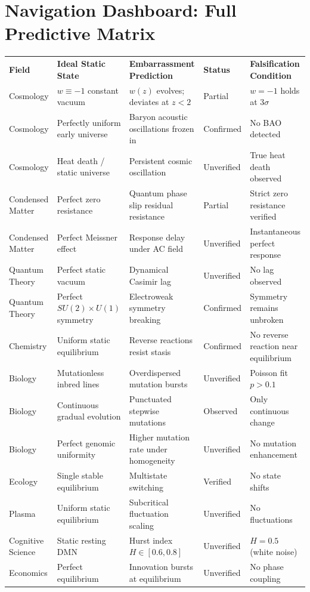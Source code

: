 \documentclass[10pt,a4paper]{article}
\begin{document}
\section*{Navigation Dashboard: Full Predictive Matrix}
\begin{tcolorbox}[title=EMBARRASSMENT PREDICTION DASHBOARD v1.0,colback=white,colframe=black!70,fonttitle=\bfseries\large]
\scriptsize
\renewcommand{\arraystretch}{1.8}
\begin{tabularx}{\textwidth}{LLLLL}
\textbf{Field} & \textbf{Ideal Static State} & \textbf{Embarrassment Prediction} & \textbf{Status} & \textbf{Falsification Condition} \\
Cosmology & $w\equiv-1$ constant vacuum & $w(z)$ evolves; deviates at $z<2$ & Partial & $w=-1$ holds at $3\sigma$ \\
Cosmology & Perfectly uniform early universe & Baryon acoustic oscillations frozen in & Confirmed & No BAO detected \\
Cosmology & Heat death / static universe & Persistent cosmic oscillation & Unverified & True heat death observed \\
Condensed Matter & Perfect zero resistance & Quantum phase slip residual resistance & Partial & Strict zero resistance verified \\
Condensed Matter & Perfect Meissner effect & Response delay under AC field & Unverified & Instantaneous perfect response \\
Quantum Theory & Perfect static vacuum & Dynamical Casimir lag & Unverified & No lag observed \\
Quantum Theory & Perfect $SU(2)\times U(1)$ symmetry & Electroweak symmetry breaking & Confirmed & Symmetry remains unbroken \\
Chemistry & Uniform static equilibrium & Reverse reactions resist stasis & Confirmed & No reverse reaction near equilibrium \\
Biology & Mutationless inbred lines & Overdispersed mutation bursts & Unverified & Poisson fit $p>0.1$ \\
Biology & Continuous gradual evolution & Punctuated stepwise mutations & Observed & Only continuous change \\
Biology & Perfect genomic uniformity & Higher mutation rate under homogeneity & Unverified & No mutation enhancement \\
Ecology & Single stable equilibrium & Multistate switching & Verified & No state shifts \\
Plasma & Uniform static equilibrium & Subcritical fluctuation scaling & Unverified & No fluctuations \\
Cognitive Science & Static resting DMN & Hurst index $H\in[0.6,0.8]$ & Unverified & $H=0.5$ (white noise) \\
Economics & Perfect equilibrium & Innovation bursts at equilibrium & Unverified & No phase coupling \\
\end{tabularx}
\end{tcolorbox}
\end{document}
